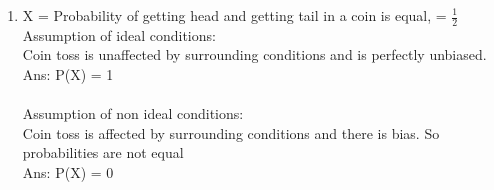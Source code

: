 \documentclass[a4paper, 12pt]{article}
\begin{document}
\begin{enumerate}
	\item X = Probability of getting head and getting 
	tail in a coin is equal, = $\frac{1}{2}$\\
	
	Assumption of ideal conditions:\\
	\quad Coin toss is unaffected by surrounding conditions
	and is perfectly unbiased.\\
	Ans: P(X) = 1 \\
	\\
	Assumption of non ideal conditions:\\
	\quad Coin toss is affected by surrounding conditions
	and there is bias. So probabilities are not equal\\
	Ans: P(X) = 0 \\
		
\end{enumerate}
\end{document}
